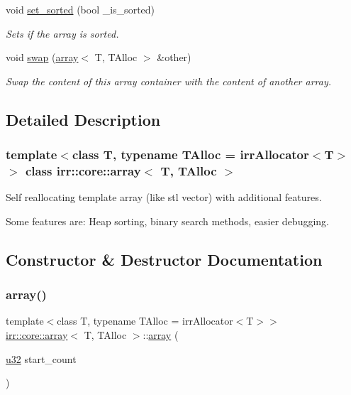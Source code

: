 \begin{DoxyCompactItemize}
\mbox{\label{classirr_1_1core_1_1array_ab73d5838db931996f66f9efcc7127b49}} 
void \hyperlink{classirr_1_1core_1_1array_ab73d5838db931996f66f9efcc7127b49}{set\+\_\+sorted} (bool \+\_\+is\+\_\+sorted)
\begin{DoxyCompactList}\small\item\em Sets if the array is sorted. \end{DoxyCompactList}\item 
void \hyperlink{classirr_1_1core_1_1array_a8857046f500a2990fc9930b204a3dbad}{swap} (\hyperlink{classirr_1_1core_1_1array}{array}$<$ T, T\+Alloc $>$ \&other)
\begin{DoxyCompactList}\small\item\em Swap the content of this array container with the content of another array. \end{DoxyCompactList}\end{DoxyCompactItemize}


\subsection{Detailed Description}
\subsubsection*{template$<$class T, typename T\+Alloc = irr\+Allocator$<$\+T$>$$>$\newline
class irr\+::core\+::array$<$ T, T\+Alloc $>$}

Self reallocating template array (like stl vector) with additional features. 

Some features are\+: Heap sorting, binary search methods, easier debugging. 

\subsection{Constructor \& Destructor Documentation}
\mbox{\label{classirr_1_1core_1_1array_ab58c4b2c09693190b43ee16e99722b43}} 
\subsubsection{\texorpdfstring{array()}{array()}}
{\footnotesize\ttfamily template$<$class T, typename T\+Alloc = irr\+Allocator$<$\+T$>$$>$ \\
\hyperlink{classirr_1_1core_1_1array}{irr\+::core\+::array}$<$ T, T\+Alloc $>$\+::\hyperlink{classirr_1_1core_1_1array}{array} (\begin{DoxyParamCaption}\item[{\hyperlink{namespaceirr_a0416a53257075833e7002efd0a18e804}{u32}}]{start\+\_\+count }\end{DoxyParamCaption})\hspace{0.3cm}{\ttfamily [inline]}}



